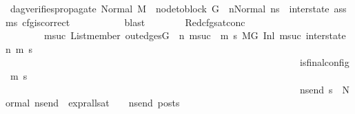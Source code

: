 \begin{isabellebody}
\ dag{\isacharunderscore}{\kern0pt}verifies{\isacharunderscore}{\kern0pt}propagate\ Normal\ {\isacartoucheopen}M{\isacharcomma}{\kern0pt}{\isasymLambda}{\isacharcomma}{\kern0pt}{\isasymGamma}{\isacharcomma}{\kern0pt}{\isasymOmega}\ {\isasymturnstile}\ {\isasymlangle}{\isacharparenleft}{\kern0pt}node{\isacharunderscore}{\kern0pt}to{\isacharunderscore}{\kern0pt}block\ G\ {\isacharbang}{\kern0pt}\ n{\isacharparenright}{\kern0pt}{\isacharcomma}{\kern0pt}Normal\ ns{}{\isasymrangle}\ {\isacharbrackleft}{\kern0pt}{\isasymrightarrow}{\isacharbrackright}{\kern0pt}\ inter{\isacharunderscore}{\kern0pt}state{\isacartoucheclose}\ assms{\isacharparenleft}{\kern0pt}{}{\isacharparenright}{\kern0pt}\ cfg{\isacharunderscore}{\kern0pt}is{\isacharunderscore}{\kern0pt}correct\ \isanewline
\ \ \ \ \ \ \ \ \isamarkupfalse%
\ blast\isanewline
\isanewline
\ \ \ \ \ \ \isamarkupfalse%
\ Red{\isacharunderscore}{\kern0pt}cfg{\isacharunderscore}{\kern0pt}sat{\isacharunderscore}{\kern0pt}conc{\isacharcolon}{\kern0pt}\ \isanewline
\ \ \ \ \ \ \ \ {\isachardoublequoteopen}{\isacharparenleft}{\kern0pt}{\isasymforall}msuc{}{\isachardot}{\kern0pt}\ List{\isachardot}{\kern0pt}member\ {\isacharparenleft}{\kern0pt}out{\isacharunderscore}{\kern0pt}edges{\isacharparenleft}{\kern0pt}G{\isacharparenright}{\kern0pt}\ {\isacharbang}{\kern0pt}\ n{\isacharparenright}{\kern0pt}\ msuc{}\ {\isasymlongrightarrow}\ {\isacharparenleft}{\kern0pt}{\isasymforall}m{\isacharprime}{\kern0pt}\ s{\isacharprime}{\kern0pt}{\isachardot}{\kern0pt}\ {\isacharparenleft}{\kern0pt}M{\isacharcomma}{\kern0pt}{\isasymLambda}{\isacharcomma}{\kern0pt}{\isasymGamma}{\isacharcomma}{\kern0pt}{\isasymOmega}{\isacharcomma}{\kern0pt}G\ {\isasymturnstile}{\isacharparenleft}{\kern0pt}Inl\ msuc{}{\isacharcomma}{\kern0pt}\ inter{\isacharunderscore}{\kern0pt}state{\isacharparenright}{\kern0pt}\ {\isacharminus}{\kern0pt}n{\isasymrightarrow}{\isacharasterisk}{\kern0pt}\ {\isacharparenleft}{\kern0pt}m{\isacharprime}{\kern0pt}{\isacharcomma}{\kern0pt}\ s{\isacharprime}{\kern0pt}{\isacharparenright}{\kern0pt}{\isacharparenright}{\kern0pt}\ {\isasymlongrightarrow}\isanewline
\ \ \ \ \ \ \ \ \ \ \ \ \ \ \ \ \ \ \ \ \ \ \ \ \ \ \ \ \ \ \ \ \ \ \ \ \ \ \ \ \ \ \ \ \ \ \ \ \ \ \ \ \ \ \ \ \ \ \ \ \ is{\isacharunderscore}{\kern0pt}final{\isacharunderscore}{\kern0pt}config\ {\isacharparenleft}{\kern0pt}m{\isacharprime}{\kern0pt}{\isacharcomma}{\kern0pt}\ s{\isacharprime}{\kern0pt}{\isacharparenright}{\kern0pt}\ {\isasymlongrightarrow}\ \isanewline
\ \ \ \ \ \ \ \ \ \ \ \ \ \ \ \ \ \ \ \ \ \ \ \ \ \ \ \ \ \ \ \ \ \ \ \ \ \ \ \ \ \ \ \ \ \ \ \ \ \ \ \ \ \ \ \ \ \ \ \ \ {\isacharparenleft}{\kern0pt}{\isasymforall}ns{\isacharunderscore}{\kern0pt}end{\isachardot}{\kern0pt}\ s{\isacharprime}{\kern0pt}\ {\isacharequal}{\kern0pt}\ Normal\ ns{\isacharunderscore}{\kern0pt}end\ {\isasymlongrightarrow}\ {\isacharparenleft}{\kern0pt}expr{\isacharunderscore}{\kern0pt}all{\isacharunderscore}{\kern0pt}sat\ {\isasymLambda}\ {\isasymGamma}\ {\isasymOmega}\ ns{\isacharunderscore}{\kern0pt}end{\isacharparenright}{\kern0pt}\ posts{\isacharparenright}{\kern0pt}{\isacharparenright}{\kern0pt}{\isacharparenright}{\kern0pt}{\isachardoublequoteclose}\ \isanewline

\end{isabellebody}
